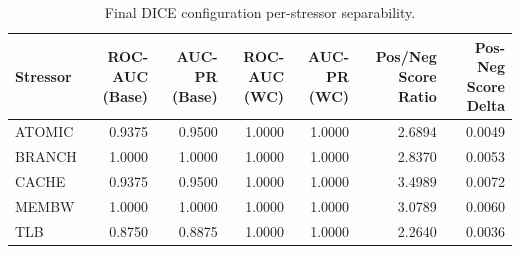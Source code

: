 \begin{table}[t]
\centering
\caption{Final DICE configuration per-stressor separability.}
\label{tab:dice_full_stressor}
\footnotesize
\begin{tabular}{lrrrrrr}
\toprule
Stressor & ROC-AUC (Base) & AUC-PR (Base) & ROC-AUC (WC) & AUC-PR (WC) & Pos/Neg Score Ratio & Pos-Neg Score Delta \\
\midrule
ATOMIC & 0.9375 & 0.9500 & 1.0000 & 1.0000 & 2.6894 & 0.0049 \\
BRANCH & 1.0000 & 1.0000 & 1.0000 & 1.0000 & 2.8370 & 0.0053 \\
CACHE & 0.9375 & 0.9500 & 1.0000 & 1.0000 & 3.4989 & 0.0072 \\
MEMBW & 1.0000 & 1.0000 & 1.0000 & 1.0000 & 3.0789 & 0.0060 \\
TLB & 0.8750 & 0.8875 & 1.0000 & 1.0000 & 2.2640 & 0.0036 \\
\bottomrule
\end{tabular}

\end{table}
